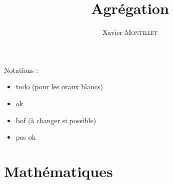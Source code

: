 \documentclass[10pt,a4paper]{report}
\newcommand{\ok}{\textcolor{OliveGreen}{\ding{52}}}
\newcommand{\todo}{\textcolor{blue}{\ding{228}}}
\newcommand{\bof}{\textcolor{orange}{\Yingyang}}
\newcommand{\nok}{\textcolor{red}{\ding{56}}}
\providecommand{\base}{.}
\begin{document}
\title{Agrégation}
\author{Xavier \textsc{Montillet}}
\maketitle
\tableofcontents

\newpage
Notations :
\begin{itemize}
	\item[\todo] todo (pour les oraux blancs)
	\item[\ok] ok
	\item[\bof] bof (à changer si possible)
	\item[\nok] pas ok
\end{itemize}



\part{Mathématiques}

\newrefsegment
\end{document}
